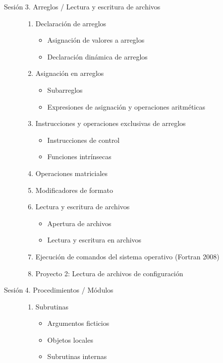 \begin{description}
  \item[Sesión 3. Arreglos / Lectura y escritura de archivos] \hfill
    \begin{enumerate}
      \item Declaración de arreglos
        \begin{itemize}
          \item Asignación de valores a arreglos
          \item Declaración dinámica de arreglos
        \end{itemize}
      \item Asignación en arreglos
        \begin{itemize}
          \item Subarreglos
          \item Expresiones de asignación y operaciones aritméticas
        \end{itemize}
      \item Instrucciones y operaciones exclusivas de arreglos
        \begin{itemize}
          \item Instrucciones de control
          \item Funciones intrínsecas
        \end{itemize}
      \item Operaciones matriciales

      \item Modificadores de formato
      \item Lectura y escritura de archivos
        \begin{itemize}
          \item Apertura de archivos
          \item Lectura y escritura en archivos
        \end{itemize}
      \item Ejecución de comandos del sistema operativo (Fortran 2008)

      \item Proyecto 2: Lectura de archivos de configuración
    \end{enumerate}

  \item[Sesión 4. Procedimientos / Módulos] \hfill
    \begin{enumerate}
      \item Subrutinas
        \begin{itemize}
          \item Argumentos ficticios
          \item Objetos locales
          \item Subrutinas internas
        \end{itemize}


\end{enumerate}
\end{description}
